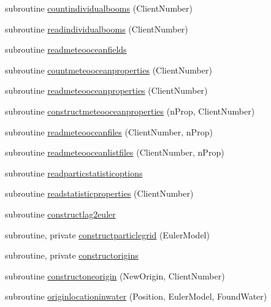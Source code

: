 \begin{DoxyCompactItemize}
subroutine \mbox{\hyperlink{namespacemodulelagrangianglobal_ac2d819c6cb2d9890063752019007589c}{countindividualbooms}} (Client\+Number)
\item 
subroutine \mbox{\hyperlink{namespacemodulelagrangianglobal_ac534055f33c12be80f6b5d331e9cca95}{readindividualbooms}} (Client\+Number)
\item 
subroutine \mbox{\hyperlink{namespacemodulelagrangianglobal_ab2f7aa5d633698c89eab11bcf4c90928}{readmeteooceanfields}}
\item 
subroutine \mbox{\hyperlink{namespacemodulelagrangianglobal_ab33bc04ab555b763cd51fa4dac937ccc}{countmeteooceanproperties}} (Client\+Number)
\item 
subroutine \mbox{\hyperlink{namespacemodulelagrangianglobal_ae1973e5270fe0bd8fe935fa360c35bd1}{readmeteooceanproperties}} (Client\+Number)
\item 
subroutine \mbox{\hyperlink{namespacemodulelagrangianglobal_afb3b7fc4fe38ef436cb911bb192358f1}{constructmeteooceanproperties}} (n\+Prop, Client\+Number)
\item 
subroutine \mbox{\hyperlink{namespacemodulelagrangianglobal_aa7411b9f44061b325d38671fe7aefded}{readmeteooceanfiles}} (Client\+Number, n\+Prop)
\item 
subroutine \mbox{\hyperlink{namespacemodulelagrangianglobal_ae46ac0f2e57613d902f2c85755570a82}{readmeteooceanlistfiles}} (Client\+Number, n\+Prop)
\item 
subroutine \mbox{\hyperlink{namespacemodulelagrangianglobal_a8e12f5629f87247807ce50e9527b9fdd}{readparticstatisticoptions}}
\item 
subroutine \mbox{\hyperlink{namespacemodulelagrangianglobal_aead4b53bdd55ea198839d3d5eda5c768}{readstatisticproperties}} (Client\+Number)
\item 
subroutine \mbox{\hyperlink{namespacemodulelagrangianglobal_a5c09d9f8068efed26002854c2ba12362}{constructlag2euler}}
\item 
subroutine, private \mbox{\hyperlink{namespacemodulelagrangianglobal_aad6524644ca62cde451d62e0964fe5de}{constructparticlegrid}} (Euler\+Model)
\item 
subroutine, private \mbox{\hyperlink{namespacemodulelagrangianglobal_a18659553d3e4f0917dd7bc0bcdb6d109}{constructorigins}}
\item 
subroutine \mbox{\hyperlink{namespacemodulelagrangianglobal_a13e19af68aa547fbcd1d97158976b7ef}{constructoneorigin}} (New\+Origin, Client\+Number)
\item 
subroutine \mbox{\hyperlink{namespacemodulelagrangianglobal_a30ffc99c4d1df3eba66898b8f54fd8e8}{originlocationinwater}} (Position, Euler\+Model, Found\+Water)

\end{DoxyCompactItemize}
